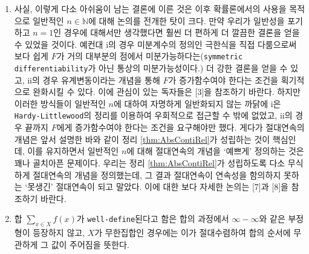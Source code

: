 \begin{enumerate}[label = \textsf{\textbf{\arabic*}}]
    \item 사실, 이렇게 다소 아쉬움이 남는 결론에 이른 것은 이후 확률론에서의 사용을 목적으로 일반적인 $n\in\mathbb{N}$에 대해 논의를 전개한 탓이 크다. 만약 우리가 일반성을 포기하고 $n=1$인 경우에 대해서만 생각했다면 훨씬 더 편하게 더 깔끔한 결론을 얻을 수 있었을 것이다. 예컨대 i의 경우 미분계수의 정의인 극한식을 직접 다룸으로써 보다 쉽게 $F$가 거의 대부분의 점에서 미분가능하다는(\texttt{symmetric differentiability}가 아닌 통상의 미분가능성이다.) 더 강한 결론을 얻을 수 있고, ii의 경우 유계변동이라는 개념을 통해 $F$가 증가함수여야 한다는 조건을 획기적으로 완화시킬 수 있다. 이에 관심이 있는 독자들은 [3]을 참조하기 바란다. 하지만 이러한 방식들이 일반적인 $n$에 대하여 자명하게 일반화되지 않는 까닭에 i은 \texttt{Hardy-Littlewood}의 정리를 이용하여 우회적으로 접근할 수 밖에 없었고, ii의 경우 끝까지 $F$에게 증가함수여야 한다는 조건을 요구해야만 했다. 게다가 절대연속의 개념은 앞서 설명한 바와 같이 정리 \ref{thm:AbsContiRel}가 성립하는 것이 핵심인데, 이를 유지하면서 일반적인 $n$에 대해 절대연속의 개념을 `예쁘게' 정의하는 것은 꽤나 골치아픈 문제이다. 우리는 정리 \ref{thm:AbsContiRel}가 성립하도록 다소 무식하게 절대연속의 개념을 정의했는데, 그 결과 절대연속이 연속성을 함의하지 못하는 `못생긴' 절대연속이 되고 말았다. 이에 대한 보다 자세한 논의는 [7]과 [8]을 참조하기 바란다.
    \item 합 $\sum_{x\in X}f(x)$가 \texttt{well-define}된다고 함은 합의 과정에서 $\infty-\infty$와 같은 부정형이 등장하지 않고, $X$가 무한집합인 경우에는 이가 절대수렴하여 합의 순서에 무관하게 그 값이 주어짐을 뜻한다.
\end{enumerate}

